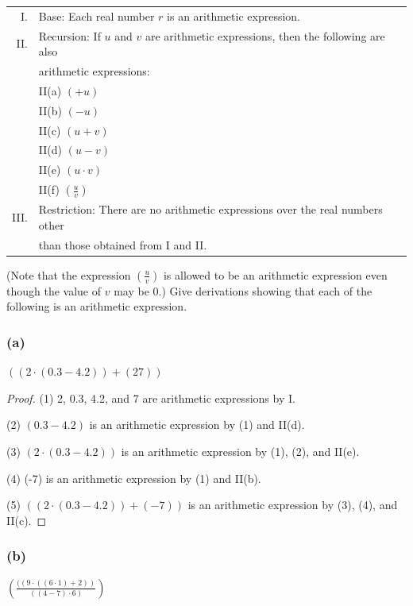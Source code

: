\documentclass[14pt]{extarticle}
\newcommand{\dps}{\displaystyle}
\begin{document}
\begin{tabular}{rl}
I. & Base: Each real number $r$ is an arithmetic expression. \\
II. & Recursion: If $u$ and $v$ are arithmetic expressions, then the following are also \\
    & arithmetic expressions: \\
& II(a) $(+u)$ \\
& II(b) $(-u)$ \\
& II(c) $(u + v)$ \\
& II(d) $(u - v)$ \\
& II(e) $(u \cdot v)$ \\
& II(f) \(\dps \left(\frac{u}{v}\right)\) \\
III. & Restriction: There are no arithmetic expressions over the real numbers other \\
     & than those obtained from I and II.
\end{tabular}

(Note that the expression \(\dps \left(\frac{u}{v}\right)\) is allowed to be an arithmetic expression even though the 
value of $v$ may be 0.) Give derivations showing that each of the following is an arithmetic expression.

\subsubsection{(a)}
\(((2 \cdot (0.3 - 4.2)) + (27))\)

\begin{proof}
(1) 2, 0.3, 4.2, and 7 are arithmetic expressions by I.

(2) \((0.3 - 4.2)\) is an arithmetic expression by (1) and II(d).

(3) \((2 \cdot (0.3 - 4.2))\) is an arithmetic expression by (1), (2), and II(e).

(4) (-7) is an arithmetic expression by (1) and II(b).

(5) \(((2 \cdot (0.3 - 4.2)) + (-7))\) is an arithmetic expression by (3), (4), and II(c).
\end{proof}

\subsubsection{(b)}
\(\dps \left( \frac{((9 \cdot ((6 \cdot 1) + 2))}{((4 - 7) \cdot 6)}\right)\)
\end{document}
